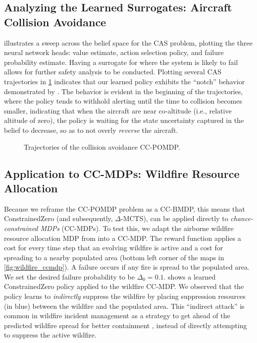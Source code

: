 \subsection{Analyzing the Learned Surrogates: Aircraft Collision Avoidance}

 illustrates a sweep across the belief space for the CAS problem, plotting the three neural network heads: value estimate, action selection policy, and failure probability estimate.
Having a surrogate for where the system is likely to fail allows for further safety analysis to be conducted.
Plotting several CAS trajectories in \cref{fig:cas_results_trajs} indicates that our learned policy exhibits the ``notch'' behavior demonstrated by \textcite{kochenderfer2012next}.
The behavior is evident in the beginning of the trajectories, where the policy tends to withhold alerting until the time to collision becomes smaller, indicating that when the aircraft are near co-altitude (i.e., relative altitude of zero), the policy is waiting for the state uncertainty captured in the belief to decrease, so as to not overly \textit{reverse} the aircraft.


\begin{figure}[t]
    \centering
    
    \hspace*{1.5cm}
    \caption{Trajectories of the collision avoidance CC-POMDP.}
    \label{fig:cas_results_trajs}
\end{figure}


\subsection{Application to CC-MDPs: Wildfire Resource Allocation}

Because we reframe the CC-POMDP problem as a CC-BMDP, this means that ConstrainedZero (and subsequently, $\Delta$-MCTS), can be applied directly to \textit{chance-constrained MDPs} (CC-MDPs).
To test this, we adapt the airborne wildfire resource allocation MDP from \textcite{griffith2017automated} into a CC-MDP.
The reward function applies a cost for every time step that an evolving wildfire is active and a cost for spreading to a nearby populated area (bottom left corner of the maps in \cref{fig:wildfire_ccmdp}).
A failure occurs if any fire is spread to the populated area.
We set the desired failure probability to be $\Delta_0 = 0.1$.
 shows a learned ConstrainedZero policy applied to the wildfire CC-MDP.
We observed that the policy learns to \textit{indirectly} suppress the wildfire by placing suppression resources (in blue) between the wildfire and the populated area.
This ``indirect attack'' is common in wildfire incident management as a strategy to get ahead of the predicted wildfire spread for better containment \cite{pyne1996introduction}, instead of directly attempting to suppress the active wildfire.

